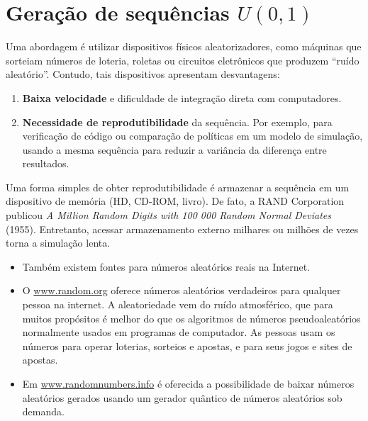 \documentclass[
  letterpaper,
  DIV=11,
  numbers=noendperiod]{scrreprt}
\providecommand{\tightlist}{%
  \setlength{\itemsep}{0pt}\setlength{\parskip}{0pt}}\usepackage{longtable,booktabs,array}
\begin{document}
\section{\texorpdfstring{Geração de sequências
\(U(0,1)\)}{Geração de sequências U(0,1)}}\label{gerauxe7uxe3o-de-sequuxeancias-u01}

Uma abordagem é utilizar dispositivos físicos aleatorizadores, como
máquinas que sorteiam números de loteria, roletas ou circuitos
eletrônicos que produzem ``ruído aleatório''. Contudo, tais dispositivos
apresentam desvantagens:

\begin{enumerate}
\def\labelenumi{\arabic{enumi}.}
\tightlist
\item
  \textbf{Baixa velocidade} e dificuldade de integração direta com
  computadores.
\item
  \textbf{Necessidade de reprodutibilidade} da sequência. Por exemplo,
  para verificação de código ou comparação de políticas em um modelo de
  simulação, usando a mesma sequência para reduzir a variância da
  diferença entre resultados.
\end{enumerate}

Uma forma simples de obter reprodutibilidade é armazenar a sequência em
um dispositivo de memória (HD, CD-ROM, livro). De fato, a RAND
Corporation publicou \emph{A Million Random Digits with 100 000 Random
Normal Deviates} (1955). Entretanto, acessar armazenamento externo
milhares ou milhões de vezes torna a simulação lenta.

\begin{tcolorbox}[enhanced jigsaw, left=2mm, toprule=.15mm, opacityback=0, title=\textcolor{quarto-callout-note-color}{\faInfo}\hspace{0.5em}{Nota}, leftrule=.75mm, breakable, colbacktitle=quarto-callout-note-color!10!white, coltitle=black, rightrule=.15mm, bottomtitle=1mm, toptitle=1mm, colframe=quarto-callout-note-color-frame, colback=white, opacitybacktitle=0.6, bottomrule=.15mm, arc=.35mm, titlerule=0mm]

\begin{itemize}
\item
  Também existem fontes para números aleatórios reais na Internet.
\item
  O \href{https://www.random.org/}{www.random.org} oferece números
  aleatórios verdadeiros para qualquer pessoa na internet. A
  aleatoriedade vem do ruído atmosférico, que para muitos propósitos é
  melhor do que os algoritmos de números pseudoaleatórios normalmente
  usados em programas de computador. As pessoas usam os números para
  operar loterias, sorteios e apostas, e para seus jogos e sites de
  apostas.
\item
  Em \href{https://www.randomnumbers.info/}{www.randomnumbers.info} é
  oferecida a possibilidade de baixar números aleatórios gerados usando
  um gerador quântico de números aleatórios sob demanda.
\end{itemize}

\end{tcolorbox}
\end{document}
